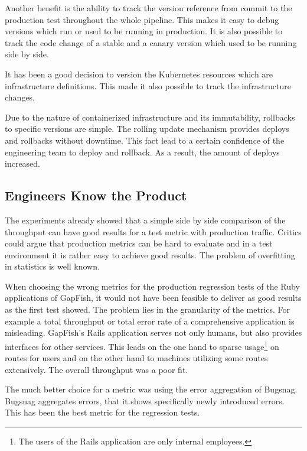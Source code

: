 Another benefit is the ability to track the version reference from commit to the production
test throughout the whole pipeline. This makes it easy to debug versions
which run or used to be running in production. It is also possible to track the code
change of a stable and a canary version which used to be running side by side.

It has been a good decision to version the Kubernetes resources which are
infrastructure definitions. This made it also possible to track the
infrastructure changes.

Due to the nature of containerized infrastructure and its immutability, rollbacks to
specific versions are simple. The rolling update mechanism provides deploys and rollbacks
without downtime. This fact lead to a certain confidence of the engineering team to deploy
and rollback. As a result, the amount of deploys increased.

\subsection{Engineers Know the Product}

The experiments already showed that a simple side by side comparison of the throughput can
have good results for a test metric with production traffic. Critics could argue that
production metrics can be hard to evaluate and in a test environment it is rather easy to
achieve good results. The problem of overfitting in statistics is well known.

When choosing the wrong metrics for the production regression tests of the Ruby
applications of GapFish, it would not have been feasible to deliver as good results as the
first test showed. The problem lies in the granularity of the metrics. For example a total
throughput or total error rate of a comprehensive application is misleading. GapFish's
Rails application serves not only humans, but also provides interfaces for other
services. This leads on the one hand to sparse usage\footnote{The users of the Rails
  application are only internal employees.} on routes for users and on the other hand
to machines utilizing some routes extensively. The overall throughput was a poor fit.

The much better choice for a metric was using the error aggregation of Bugsnag. Bugsnag
aggregates errors, that it shows specifically newly introduced errors. This has been the
best metric for the regression tests.


